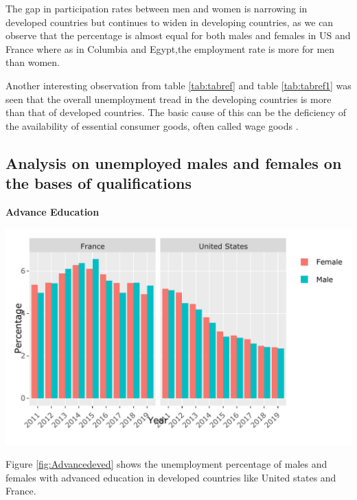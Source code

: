 \documentclass[11pt,a4paper,]{article}
\let\origfigure\figure
\let\endorigfigure\endfigure
\renewenvironment{figure}[1][2] {
    \expandafter\origfigure\expandafter[H]
} {
    \endorigfigure
}
\begin{document}
The gap in participation rates between men and women is narrowing in developed countries but continues to widen in developing countries, as we can observe that the percentage is almost equal for both males and females in US and France where as in Columbia and Egypt,the employment rate is more for men than women.\autocite{social}

Another interesting observation from table \ref{tab:tabref} and table \ref{tab:tabref1} was seen that the overall unemployment tread in the developing countries is more than that of developed countries. The basic cause of this can be the deficiency of the availability of essential consumer goods, often called wage goods \autocite{education}.

\hypertarget{analysis-on-unemployed-males-and-females-on-the-bases-of-qualifications}{%
\subsection{Analysis on unemployed males and females on the bases of qualifications}\label{analysis-on-unemployed-males-and-females-on-the-bases-of-qualifications}}

\textbf{Advance Education}

\begin{figure}
\centering
\includegraphics{The_Outsiders_5513_files/figure-latex/Advancedeved-1.pdf}
\caption{\label{fig:Advancedeved}Unemployment with advanced education in developed countries}
\end{figure}

Figure \ref{fig:Advancedeved} shows the unemployment percentage of males and females with advanced education in developed countries like United states and France.
\end{document}
